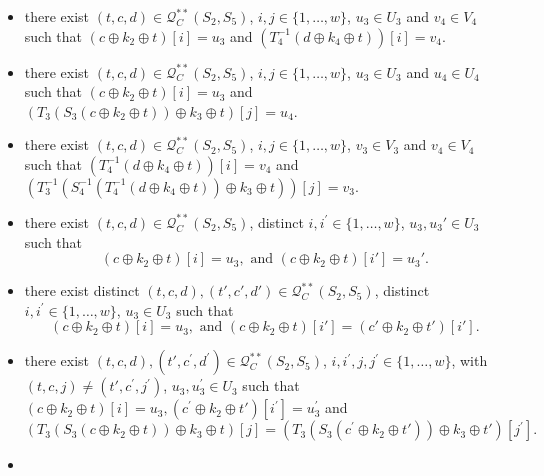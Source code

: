 \begin{itemize}
  \item[\feai]
  there exist $(t, c, d) \in \mathcal{Q}_{C}^{**}\left(S_{2}, S_{5}\right)$, $i, j \in\{1, \ldots, w\}$, $u_{3} \in U_{3}$ and $v_{4} \in V_{4}$ such that $\left(c \oplus k_{2} \oplus t\right)[i] = u_3$ and $\left(T_{4}^{-1}\left(d \oplus k_{4} \oplus t\right)\right)[i] = v_4$.
  \item[\feaii]
  there exist $(t, c, d) \in \mathcal{Q}_{C}^{**}\left(S_{2}, S_{5}\right)$, $i, j \in\{1, \ldots, w\}$, $u_{3} \in U_{3}$ and $u_{4} \in U_{4}$ such that $\left(c \oplus k_{2} \oplus t\right)[i] = u_3$ and $\left(T_{3}\left(S_{3}\left(c \oplus k_{2} \oplus t\right)\right) \oplus k_{3} \oplus t\right)[j] = u_4$.
  \item[\feaiii]
  there exist $(t, c, d) \in \mathcal{Q}_{C}^{**}\left(S_{2}, S_{5}\right)$, $i, j \in\{1, \ldots, w\}$, $v_{3} \in V_{3}$ and $v_{4} \in V_{4}$ such that $\left(T_{4}^{-1}\left(d \oplus k_{4} \oplus t\right)\right)[i] = v_4$ and $\left(T_{3}^{-1}\left(S_{4}^{-1}\left(T_{4}^{-1}\left(d \oplus k_{4} \oplus t\right)\right) \oplus k_{3} \oplus t\right)\right)[j] = v_3$.
  \item[\feaiv]
  there exist $(t, c, d) \in \mathcal{Q}_{C}^{**}\left(S_{2}, S_{5}\right)$, distinct $i, i^{\prime}\in\{1, \ldots, w\}$, $u_{3},u_{3}' \in U_{3}$ such that
  $$\left(c \oplus k_{2} \oplus t\right)[i] = u_3,\text{ and }
  \left(c \oplus k_{2} \oplus t\right)[i']= u_3'.$$
  \item[\feav]
  there exist distinct $(t, c, d),(t', c', d') \in \mathcal{Q}_{C}^{**}\left(S_{2}, S_{5}\right)$, distinct $i, i^{\prime}\in\{1, \ldots, w\}$, $u_{3} \in U_{3}$ such that
  $$\left(c \oplus k_{2} \oplus t\right)[i] = u_3,\text{ and }
  \left(c \oplus k_{2} \oplus t\right)[i']=\left(c' \oplus k_{2} \oplus t'\right)[i'].$$
  \item[\feavi]
  there exist $(t, c, d), (t', c^{\prime}, d^{\prime}) \in \mathcal{Q}_{C}^{**}\left(S_{2}, S_{5}\right)$, $i, i^{\prime},j, j^{\prime} \in\{1, \ldots, w\}$, with$(t, c, j) \neq \left(t', c^{\prime}, j^{\prime}\right)$, $u_{3}, u_{3}^{\prime} \in U_{3}$ such that $\left(c \oplus k_{2} \oplus t\right)[i] = u_3, \left(c^{\prime} \oplus k_{2} \oplus t'\right)[i^{\prime}] = u_3^{\prime}$ and
$$
  \left(T_{3}\left(S_{3}\left(c \oplus k_{2} \oplus t\right)\right) \oplus k_{3} \oplus t\right)[j] = \left(T_{3}\left(S_{3}\left(c^{\prime} \oplus k_{2} \oplus t'\right)\right) \oplus k_{3} \oplus t'\right)[j^{\prime}].
$$
  \item[\feavii]

\end{itemize}
